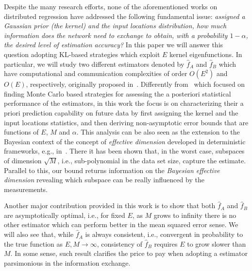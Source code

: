 \documentclass[10pt,twocolumn,twoside]{IEEEtran}					%
\theoremstyle	{plain}
\begin{document}
Despite the many research efforts, none of the aforementioned works on distributed regression have addressed the following fundamental issue: \emph{assigned a Gaussian prior (the kernel) and the input locations distribution, how much information does the network need to exchange to obtain, with a probability $1-\alpha$, the desired level of estimation accuracy?} In this paper we will answer this question adopting \ac{KL}-based strategies which exploit $E$ kernel eigenfunctions. In particular, we will study two different estimators denoted by $\widehat{f}_{A}$ and $\widehat{f}_{B}$ which have computational and communication complexities of order $O(E^2)$ and $O(E)$, respectively, originally proposed in~\cite{varagnolo2012distributed}. Differently from~\cite{varagnolo2012distributed} which focused on finding Monte Carlo based strategies for assessing the a posteriori statistical performance of the estimators, in this work the focus is on characterizing their a priori prediction capability on future data by first assigning the kernel and the input locations statistics, and then deriving non-asymptotic error bounds that are functions of $E$, $M$ and $\alpha$. This analysis can be also seen as the extension to the Bayesian context of the concept of \emph{effective dimension} developed in deterministic frameworks, e.g., in~\cite{Zhang2005}. There it has been shown that, in the worst case, subspaces of dimension $\sqrt M$, i.e., sub-polynomial in the data set size, capture the estimate. Parallel to this, our bound returns information on the \emph{Bayesian effective dimension} revealing which subspace can be really influenced by the measurements.

Another major contribution provided in this work is to show that both $\widehat{f}_{A}$ and $\widehat{f}_{B}$ are asymptotically optimal, i.e., for fixed $E$, as $M$ grows to infinity there is no other estimator which can perform better in the mean squared error sense. We will also see that, while $\widehat{f}_{A}$ is always consistent, i.e., convergent in probability to the true function as $E,M \rightarrow \infty$, consistency of $\widehat{f}_{B}$ requires $E$ to grow slower than $M$. In some sense, such result clarifies the price to pay when adopting a estimator parsimonious in the information exchange.
\end{document}
